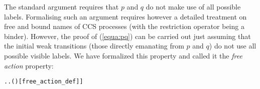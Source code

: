 The standard argument \cite{Mil89} requires that $p$
and $q$ do not make use of all possible labels.
Formalising such an argument requires however 
a detailed
treatment on free and bound names  of CCS
processes (with the restriction operator being a binder).
However, the proof of (\ref{equa:pq}) can be carried out 
just assuming that the 
initial weak transitions (those directly emanating from 
 $p$ and $q$) do not use all possible visible labels.
We
have formalized this property and
 called it the \emph{free action} property:
\begin{alltt}
  \HOLSymConst{\HOLTokenEquiv{}} \HOLSymConst{\HOLTokenExists{}}. \HOLSymConst{\HOLTokenForall{}}. \HOLSymConst{\HOLTokenNeg{}}( \HOLTokenWeakTransBegin{} \HOLTokenWeakTransEnd {})\hfill{[free_action_def]]}
\end{alltt}

